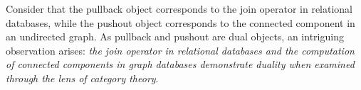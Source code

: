 
Consider that the pullback object corresponds to the join operator in relational databases, while the pushout object corresponds to the connected component in an undirected graph. As pullback and pushout are dual objects, an intriguing observation arises: \textit{the join operator in relational databases and the computation of connected components in graph databases demonstrate duality when examined through the lens of category theory}.









